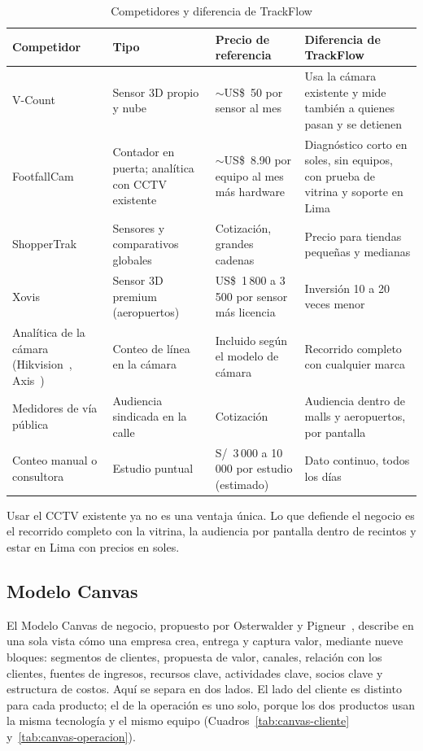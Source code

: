 \documentclass[12pt,a4paper]{article}
\begin{document}
\begin{table}[H]
\caption{Competidores y diferencia de TrackFlow}
\label{tab:competencia}
\centering
\footnotesize
\renewcommand{\arraystretch}{1.12}
\begin{tabular}{|L{0.18\textwidth}|L{0.22\textwidth}|L{0.22\textwidth}|L{0.28\textwidth}|}
\hline
\textbf{Competidor} & \textbf{Tipo} & \textbf{Precio de referencia} & \textbf{Diferencia de TrackFlow} \\
\hline
V-Count~\cite{vcount} & Sensor 3D propio y nube & $\sim$US\$~50 por sensor al mes & Usa la cámara existente y mide también a quienes pasan y se detienen \\
\hline
FootfallCam~\cite{footfallcam} & Contador en puerta; analítica con CCTV existente & $\sim$US\$~8.90 por equipo al mes más hardware & Diagnóstico corto en soles, sin equipos, con prueba de vitrina y soporte en Lima \\
\hline
ShopperTrak~\cite{shoppertrak} & Sensores y comparativos globales & Cotización, grandes cadenas & Precio para tiendas pequeñas y medianas \\
\hline
Xovis~\cite{xovis} & Sensor 3D premium (aeropuertos) & US\$~1\,800 a 3\,500 por sensor más licencia & Inversión 10 a 20 veces menor \\
\hline
Analítica de la cámara (Hikvision~\cite{hikvision}, Axis~\cite{axis}) & Conteo de línea en la cámara & Incluido según el modelo de cámara & Recorrido completo con cualquier marca \\
\hline
Medidores de vía pública~\cite{mn-ooh} & Audiencia sindicada en la calle & Cotización & Audiencia dentro de malls y aeropuertos, por pantalla \\
\hline
Conteo manual o consultora & Estudio puntual & S/~3\,000 a 10\,000 por estudio (estimado) & Dato continuo, todos los días \\
\hline
\end{tabular}
\end{table}

Usar el CCTV existente ya no es una ventaja única. Lo que defiende el negocio
es el recorrido completo con la vitrina, la audiencia por pantalla dentro de
recintos y estar en Lima con precios en soles.

\subsection{Modelo Canvas}

El Modelo Canvas de negocio, propuesto por Osterwalder y Pigneur~\cite{osterwalder2010}, describe en
una sola vista cómo una empresa crea, entrega y captura valor, mediante nueve
bloques: segmentos de clientes, propuesta de valor, canales, relación con los
clientes, fuentes de ingresos, recursos clave, actividades clave, socios clave
y estructura de costos. Aquí se separa en dos lados. El lado del cliente es
distinto para cada producto; el de la operación es uno solo, porque los dos productos usan la misma tecnología y el mismo equipo
(Cuadros~\ref{tab:canvas-cliente} y~\ref{tab:canvas-operacion}).
\end{document}
